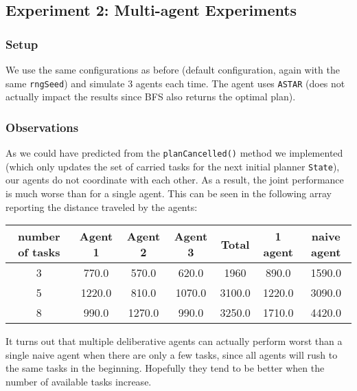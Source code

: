 \documentclass[11pt]{article}
\begin{document}
\subsection{Experiment 2: Multi-agent Experiments}

\subsubsection{Setup}
We use the same configurations as before (default configuration, again
with the same \verb|rngSeed|) and simulate 3 agents each time. The agent uses
\verb|ASTAR| (does not actually impact the results since BFS also returns the
optimal plan).

\subsubsection{Observations}

As we could have predicted from the \verb|planCancelled()| method we implemented
(which only updates the set of carried tasks for the next initial planner
\verb|State|), our agents do not coordinate with each other. As a result, the
joint performance is much worse than for a single agent. This can be seen in the
following array reporting the distance traveled by the agents:

\vspace{0.1in}
\begin{tabular}{|c|c|c|c|c|c|c|}
\hline 
number of tasks & Agent 1 & Agent 2 & Agent 3 & Total & 1 agent & naive agent \\ 
\hline 
3 & 770.0 & 570.0 & 620.0 & 1960 & 890.0 & 1590.0\\ 
\hline 
5 & 1220.0 & 810.0 & 1070.0 & 3100.0 & 1220.0 & 3090.0\\ 
\hline 
8 & 990.0 & 1270.0 & 990.0 & 3250.0 & 1710.0 & 4420.0\\ 
\hline 
\end{tabular} 
\vspace{0.1in}

It turns out that multiple deliberative agents can actually perform worst than a
single naive agent when there are only a few tasks, since all agents will rush
to the same tasks in the beginning. Hopefully they tend to be better when the
number of available tasks increase.
\end{document}
